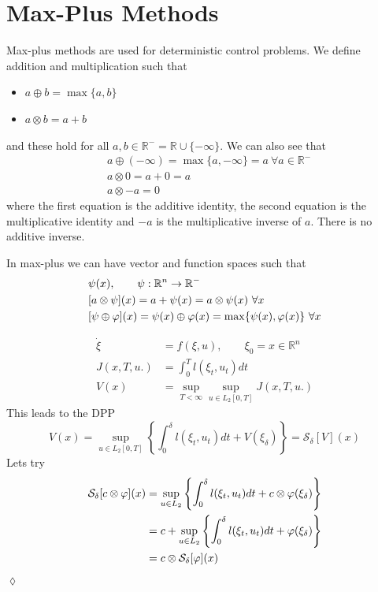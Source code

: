 \section{Max-Plus Methods}
Max-plus methods are used for deterministic control problems. We define addition and multiplication such that
\begin{itemize}
\item $a\oplus b=\max\{a,b\}$
\item $a\otimes b = a+b$
\end{itemize}
and these hold for all $a,b\in\mathbb{R}^- = \mathbb{R}\cup\{-\infty\}$. We can also see that
\begin{align*}
&a\oplus(-\infty) = \max\{a,-\infty\} = a ~\forall a\in\mathbb{R}^- \\
&a\otimes0 = a+0=a \\
&a\otimes-a = 0
\end{align*}
where the first equation is the additive identity, the second equation is the multiplicative identity and $-a$ is the multiplicative inverse of $a$. There is no additive inverse.

In max-plus we can have vector and function spaces such that
\begin{align*}
&\psi(x), \qquad \psi:\mathbb{R}^n\to\mathbb{R}^- \\
&[a\otimes \psi](x) = a+\psi(x) = a\otimes\psi(x) ~\forall x \\
&[\psi\oplus\varphi](x) = \psi(x)\oplus\varphi(x) = \max\{\psi(x),\varphi(x)\} ~\forall x
\end{align*}

\begin{example}
\begin{align*}
\dot{\xi} &= f(\xi,u), \qquad \xi_0=x\in\mathbb{R}^n \\
J(x,T,u.) &= \int_0^Tl(\xi_t,u_t)dt \\
V(x) &= \sup_{T<\infty}\sup_{u\in L_2[0,T]}J(x,T,u.)
\end{align*}
This leads to the DPP
$$V(x) = \sup_{u\in L_2[0,T]}\left\lbrace \int_0^\delta l(\xi_t,u_t)dt + V(\xi_\delta) \right\rbrace = \mathcal{S}_\delta[V](x)$$
Lets try
\begin{align*}
\mathcal{S}_\delta[c\otimes\varphi](x) &= \sup_{u\in L_2}\left\lbrace \int_0^\delta l(\xi_t,u_t)dt + c\otimes\varphi(\xi_\delta) \right\rbrace \\
&= c + \sup_{u\in L_2}\left\lbrace \int_0^\delta l(\xi_t,u_t)dt + \varphi(\xi_\delta)\right\rbrace \\
&= c\otimes\mathcal{S}_\delta[\varphi](x)
\end{align*}
$\lozenge$
\end{example}

